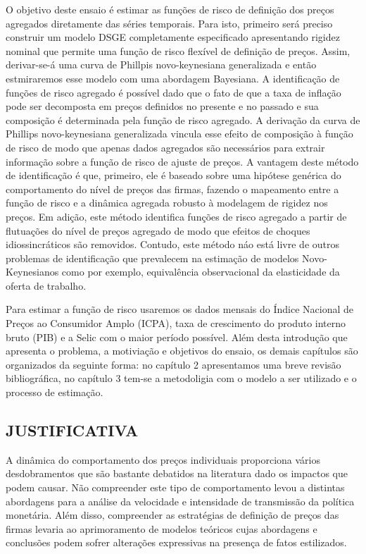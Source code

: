 \documentclass[twoside,a4paper,11pt]{report}
\begin{document}
O objetivo deste ensaio é estimar as funções de risco de definição dos preços agregados diretamente das séries temporais. Para isto, primeiro será preciso construir um modelo DSGE completamente especificado apresentando rigidez nominal que permite uma função de risco flexível de definição de preços. Assim, derivar-se-á uma curva de Phillpis novo-keynesiana generalizada e então estmiraremos esse modelo com uma abordagem Bayesiana. A identificação de funções de risco agregado é possível dado que o fato de que a taxa de inflação pode ser decomposta em preços definidos no presente e no passado e sua composição é determinada pela função de risco agregado. A derivação da curva de Phillips novo-keynesiana generalizada vincula esse efeito de composição à função de risco de modo que apenas dados agregados são necessários para extrair informação sobre a função de risco de ajuste de preços. A vantagem deste método de identificação é que, primeiro, ele é baseado sobre uma hipótese genérica do comportamento do nível de preços das firmas, fazendo o mapeamento entre a função de risco e a dinâmica agregada robusto à modelagem de rigidez nos preços. Em adição, este método identifica funções de risco agregado a partir de flutuações do nível de preços agregado de modo que efeitos de choques idiossincráticos são removidos. Contudo, este método náo está livre de outros problemas de identificação que prevalecem na estimação de modelos Novo-Keynesianos como por exemplo, equivalência observacional da elasticidade da oferta de trabalho. 

Para estimar a função de risco usaremos os dados mensais do Índice Nacional de Preços ao Consumidor Amplo (ICPA), taxa de crescimento do produto interno bruto (PIB) e a Selic com o maior período possível. Além desta introdução que apresenta o problema, a motiviação e objetivos do ensaio, os demais capítulos são organizados da seguinte forma: no capítulo 2 apresentamos uma breve revisão bibliográfica, no capítulo 3 tem-se a metodoligia com o modelo a ser utilizado e o processo de estimação.


\subsection*{JUSTIFICATIVA}

A dinâmica do comportamento dos preços individuais proporciona vários desdobramentos que são bastante debatidos na literatura dado os impactos que podem causar. Não compreender este tipo de comportamento levou a distintas abordagens para a análise da velocidade e intensidade de transmissão da política monetária. Além disso, compreender as estratégias de definição de preços das firmas levaria ao aprimoramento de modelos teóricos cujas abordagens e conclusões podem sofrer alterações expressivas na presença de fatos estilizados. 
\end{document}
